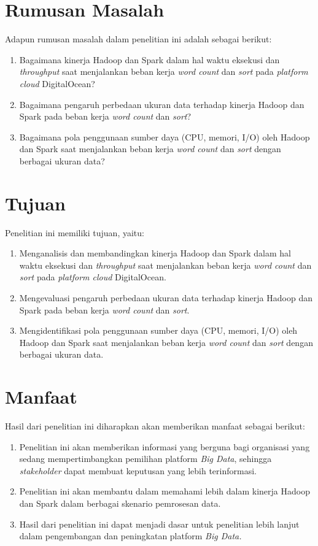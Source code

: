 \section{Rumusan Masalah}
Adapun rumusan masalah dalam penelitian ini adalah sebagai berikut:
\begin{enumerate}
\item Bagaimana kinerja Hadoop dan Spark dalam hal waktu eksekusi dan \textit{throughput} saat menjalankan beban kerja \textit{word count} dan \textit{sort} pada \textit{platform cloud} DigitalOcean?
\item Bagaimana pengaruh perbedaan ukuran data terhadap kinerja Hadoop dan Spark pada beban kerja \textit{word count} dan \textit{sort}?
\item Bagaimana pola penggunaan sumber daya (CPU, memori, I/O) oleh Hadoop dan Spark saat menjalankan beban kerja \textit{word count} dan \textit{sort} dengan berbagai ukuran data?
\end{enumerate}

\section{Tujuan}
Penelitian ini memiliki tujuan, yaitu:
\begin{enumerate}
\item Menganalisis dan membandingkan kinerja Hadoop dan Spark dalam hal waktu eksekusi dan \textit{throughput} saat menjalankan beban kerja \textit{word count} dan \textit{sort} pada \textit{platform cloud} DigitalOcean.
\item Mengevaluasi pengaruh perbedaan ukuran data terhadap kinerja Hadoop dan Spark pada beban kerja \textit{word count} dan \textit{sort}.
\item Mengidentifikasi pola penggunaan sumber daya (CPU, memori, I/O) oleh Hadoop dan Spark saat menjalankan beban kerja \textit{word count} dan \textit{sort} dengan berbagai ukuran data.
\end{enumerate}

\section{Manfaat}
Hasil dari penelitian ini diharapkan akan memberikan manfaat sebagai berikut:
\begin{enumerate}
	\item 
	Penelitian ini akan memberikan informasi yang berguna bagi organisasi yang sedang mempertimbangkan pemilihan platform \textit{Big Data}, sehingga \textit{stakeholder} dapat membuat keputusan yang lebih terinformasi.	
	\item
	Penelitian ini akan membantu dalam memahami lebih dalam kinerja Hadoop dan Spark dalam berbagai skenario pemrosesan data.
	\item
	Hasil dari penelitian ini dapat menjadi dasar untuk penelitian lebih lanjut dalam pengembangan dan peningkatan platform \textit{Big Data.}
\end{enumerate}

